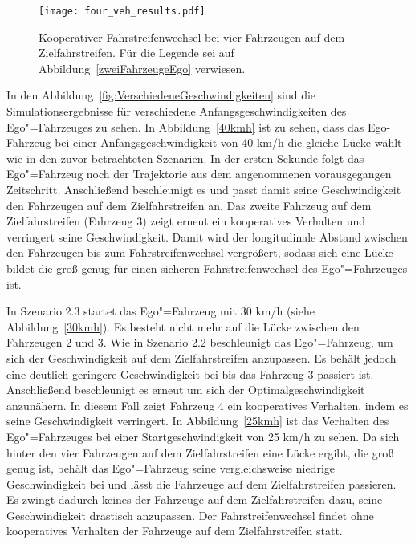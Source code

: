 \begin{figure}[!htbp]
    \centering
    \texttt{[image: four\_veh\_results.pdf]}
    \caption[Ergebnisse Szenario 2.1]{Kooperativer Fahrstreifenwechsel bei vier Fahrzeugen auf dem Zielfahrstreifen. F\"ur die Legende sei auf Abbildung~\ref{zweiFahrzeugeEgo} verwiesen.}
    \label{fig:VierFahrzeuge} 
\end{figure}


In den Abbildung~\ref{fig:VerschiedeneGeschwindigkeiten} sind die Simulationsergebnisse f\"ur verschiedene Anfangsgeschwindigkeiten des Ego"=Fahrzeuges zu sehen.
In Abbildung~\ref{40kmh} ist zu sehen, dass das Ego-Fahrzeug bei einer Anfangsgeschwindigkeit von 40 km/h die gleiche L\"ucke w\"ahlt wie in den zuvor betrachteten Szenarien.
In der ersten Sekunde folgt das Ego"=Fahrzeug noch der Trajektorie aus dem angenommenen vorausgegangen Zeitschritt.
Anschlie{\ss}end beschleunigt es und passt damit seine Geschwindigkeit den Fahrzeugen auf dem Zielfahrstreifen an.
Das zweite Fahrzeug auf dem Zielfahrstreifen (Fahrzeug 3) zeigt erneut ein kooperatives Verhalten und verringert seine Geschwindigkeit.
Damit wird der longitudinale Abstand zwischen den Fahrzeugen bis zum Fahrstreifenwechsel vergr\"o{\ss}ert, sodass sich eine L\"ucke bildet die gro{\ss} genug f\"ur einen sicheren Fahrstreifenwechsel des Ego"=Fahrzeuges ist.

In Szenario 2.3 startet das Ego"=Fahrzeug mit 30 km/h (siehe Abbildung~\ref{30kmh}).
Es besteht nicht mehr auf die L\"ucke zwischen den Fahrzeugen 2 und 3.
Wie in Szenario 2.2 beschleunigt das Ego"=Fahrzeug, um sich der Geschwindigkeit auf dem Zielfahrstreifen anzupassen.
Es beh\"alt jedoch eine deutlich geringere Geschwindigkeit bei bis das Fahrzeug 3 passiert ist.
Anschlie{\ss}end beschleunigt es erneut um sich der Optimalgeschwindigkeit anzun\"ahern.
In diesem Fall zeigt Fahrzeug 4 ein kooperatives Verhalten, indem es seine Geschwindigkeit verringert.
In Abbildung~\ref{25kmh} ist das Verhalten des Ego"=Fahrzeuges bei einer Startgeschwindigkeit von 25 km/h zu sehen.
Da sich hinter den vier Fahrzeugen auf dem Zielfahrstreifen eine L\"ucke ergibt, die gro{\ss} genug ist, beh\"alt das Ego"=Fahrzeug seine vergleichsweise niedrige Geschwindigkeit bei und l\"asst die Fahrzeuge auf dem Zielfahrstreifen passieren.
Es zwingt dadurch keines der Fahrzeuge auf dem Zielfahrstreifen dazu, seine Geschwindigkeit drastisch anzupassen.
Der Fahrstreifenwechsel findet ohne kooperatives Verhalten der Fahrzeuge auf dem Zielfahrstreifen statt.

